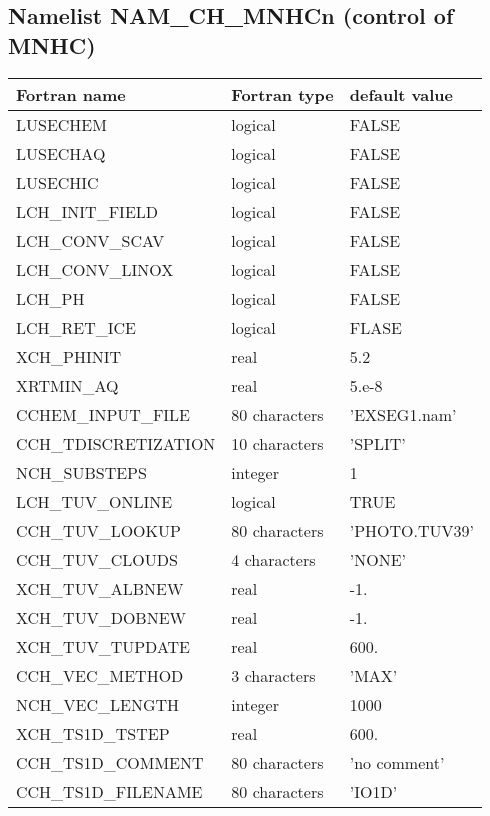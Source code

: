 \subsection{Namelist NAM\_CH\_MNHCn (control of MNHC)}
\label{ss:chem}

\begin{center}
\begin{tabular} {|l|l|l|}
\hline
Fortran name & Fortran type & default value \\
\hline
LUSECHEM                & logical       & FALSE      \\
LUSECHAQ 		&logical 	&FALSE\\
LUSECHIC 		&logical 	&FALSE\\
LCH\_INIT\_FIELD 		&logical 	&FALSE\\
LCH\_CONV\_SCAV 		&logical 	&FALSE\\
LCH\_CONV\_LINOX 		&logical 	&FALSE\\
LCH\_PH			&logical	&FALSE\\
LCH\_RET\_ICE		&logical	&FLASE\\
XCH\_PHINIT		&real		&5.2\\
XRTMIN\_AQ		&real		&5.e-8\\
CCHEM\_INPUT\_FILE 	&80 characters 	&'EXSEG1.nam'\\
CCH\_TDISCRETIZATION 	&10 characters 	&'SPLIT'\\
NCH\_SUBSTEPS 		&integer 	&1\\
LCH\_TUV\_ONLINE 		&logical 	&TRUE\\
CCH\_TUV\_LOOKUP 		&80 characters 	&'PHOTO.TUV39'\\
CCH\_TUV\_CLOUDS 		&4 characters 	&'NONE'\\
XCH\_TUV\_ALBNEW 		&real 		&-1.\\
XCH\_TUV\_DOBNEW 		&real 		&-1.\\
XCH\_TUV\_TUPDATE 	&real 		&600.\\
CCH\_VEC\_METHOD 		&3 characters 	&'MAX'\\
NCH\_VEC\_LENGTH 		&integer 	&1000\\
XCH\_TS1D\_TSTEP 		&real 		&600.\\
CCH\_TS1D\_COMMENT 	&80 characters 	&'no comment'\\
CCH\_TS1D\_FILENAME 	&80 characters 	&'IO1D'\\
\hline
\end{tabular}
\end{center}


